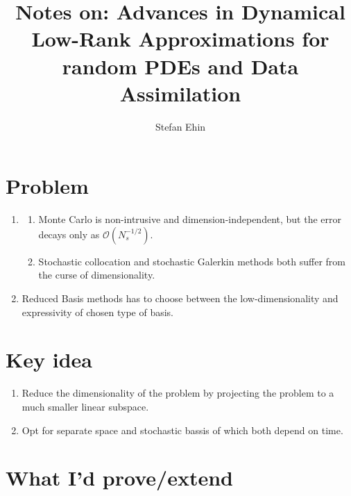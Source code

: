 \documentclass{article}
\author{Stefan Ehin}
\title{Notes on: Advances in Dynamical Low-Rank Approximations for
random PDEs and Data Assimilation}
\begin{document}
\maketitle

\section*{Problem}
\begin{enumerate}
    \item \begin{enumerate}
        \item Monte Carlo is non-intrusive and dimension-independent, but the error decays only as $\mathscr{O}(N_s^{-1/2})$.
        \item Stochastic collocation and stochastic Galerkin methods both suffer from the curse of dimensionality.
    \end{enumerate}
    \item Reduced Basis methods has to choose between the low-dimensionality and expressivity of chosen type of basis.
\end{enumerate}

\section*{Key idea}
\begin{enumerate}
    \item Reduce the dimensionality of the problem by projecting the problem to a much smaller linear subspace.
    \item Opt for separate space and stochastic bassis of which both depend on time.
\end{enumerate}

\section*{What I'd prove/extend}
	
\end{document}
